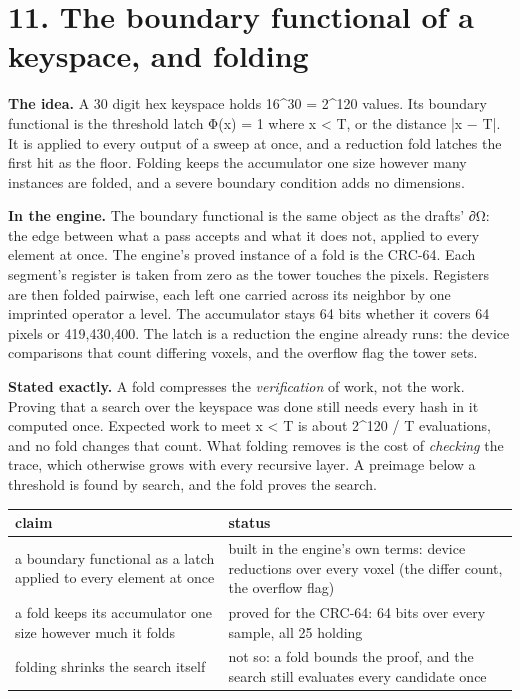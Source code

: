 \section{\texorpdfstring{11. The boundary functional of a keyspace, and folding}{11. The boundary functional of a keyspace, and folding}}

\textbf{The idea.} A 30 digit hex keyspace holds 16\textasciicircum{}30 = 2\textasciicircum{}120 values. Its boundary functional is the threshold latch Φ(x) = 1 where x < T, or the distance |x − T|. It is applied to every output of a sweep at once, and a reduction fold latches the first hit as the floor. Folding keeps the accumulator one size however many instances are folded, and a severe boundary condition adds no dimensions.

\textbf{In the engine.} The boundary functional is the same object as the drafts' ∂Ω: the edge between what a pass accepts and what it does not, applied to every element at once. The engine's proved instance of a fold is the CRC-64. Each segment's register is taken from zero as the tower touches the pixels. Registers are then folded pairwise, each left one carried across its neighbor by one imprinted operator a level. The accumulator stays 64 bits whether it covers 64 pixels or 419,430,400. The latch is a reduction the engine already runs: the device comparisons that count differing voxels, and the overflow flag the tower sets.

\textbf{Stated exactly.} A fold compresses the \emph{verification} of work, not the work. Proving that a search over the keyspace was done still needs every hash in it computed once. Expected work to meet x < T is about 2\textasciicircum{}120 / T evaluations, and no fold changes that count. What folding removes is the cost of \emph{checking} the trace, which otherwise grows with every recursive layer. A preimage below a threshold is found by search, and the fold proves the search.

{\small
\setlength{\tabcolsep}{6pt}
\begin{longtable}{>{\RaggedRight\arraybackslash}p{}>{\RaggedRight\arraybackslash}p{}}
\toprule
claim & status \\
\midrule
\endhead
a boundary functional as a latch applied to every element at once & built in the engine's own terms: device reductions over every voxel (the differ count, the overflow flag) \\
a fold keeps its accumulator one size however much it folds & proved for the CRC-64: 64 bits over every sample, all 25 holding \\
folding shrinks the search itself & not so: a fold bounds the proof, and the search still evaluates every candidate once \\
\bottomrule
\end{longtable}
}

